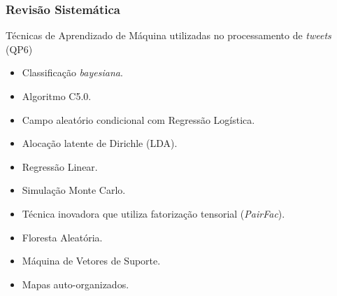 \documentclass{beamer}
\begin{document}
\begin{frame}
\frametitle{Revisão Sistemática}
\begin{block}{Técnicas de Aprendizado de Máquina utilizadas no processamento de \textit{tweets} (QP6)}
\begin{itemize}
\item \alert{Classificação \textit{bayesiana}}.
\item Algoritmo C5.0.
\item Campo aleatório condicional com Regressão Logística.
\item Alocação latente de Dirichle (LDA).
\item Regressão Linear.
\item Simulação Monte Carlo.
\item Técnica inovadora que utiliza fatorização tensorial   (\textit{PairFac}).
\item \alert{Floresta Aleatória}.
\item \alert{Máquina de Vetores de Suporte}.
\item Mapas auto-organizados.
\end{itemize}

\end{block}
\end{frame}
\end{document}
